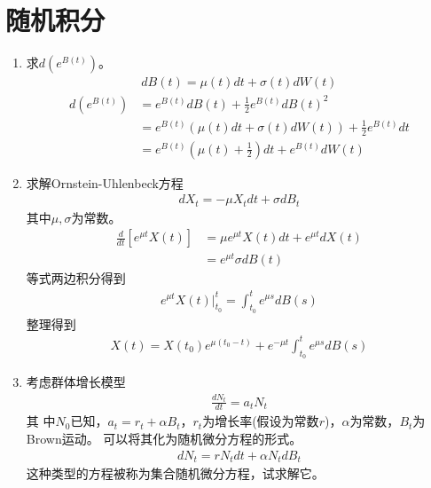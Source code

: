 \section{随机积分}

\begin{enumerate}
	\item 求\(d(e^{B(t)})\)。
	      \begin{align*}
		      dB(t)=\mu(t)dt+\sigma(t)dW(t)
	      \end{align*}
	      \begin{align*}
		      d(e^{B(t)}) & =e^{B(t)}dB(t)+\frac{1}{2}e^{B(t)}dB(t)^2                \\
		                  & =e^{B(t)}(\mu(t)dt+\sigma(t)dW(t))+\frac{1}{2}e^{B(t)}dt \\
		                  & =e^{B(t)}(\mu(t)+\frac{1}{2})dt+e^{B(t)}dW(t)
	      \end{align*}
	\item 求解Ornstein-Uhlenbeck方程\begin{align*}dX_t=-\mu X_tdt+\sigma dB_t\end{align*}其中\(\mu,\sigma\)为常数。
	      \begin{align*}
		      \frac{d}{dt}[e^{\mu t}X(t)]
		       & =\mu e^{\mu t}X(t)dt+e^{\mu t}dX(t) \\
		       & =e^{\mu t}\sigma dB(t)
	      \end{align*}
	      等式两边积分得到
	      \begin{align*}
		      e^{\mu t}X(t)\bigg|^t_{t_0}=\int_{t_0}^{t}e^{\mu s}dB(s)
	      \end{align*}
	      整理得到
	      \begin{align*}
		      X(t)=X(t_0)e^{\mu (t_0-t)}+e^{-\mu t}\int_{t_0}^{t}e^{\mu s}dB(s)
	      \end{align*}
	\item 考虑群体增长模型
	      \begin{align*}
		      \frac{dN_t}{dt}=a_tN_t
	      \end{align*}其
	      中\(N_0\)已知，\(a_t=r_t+\alpha B_t\)，\(r_t\)为增长率(假设为常数\(r\))，\(\alpha\)为常数，\(B_t\)为Brown运动。
	      可以将其化为随机微分方程的形式。
	      \begin{align*}
		      dN_t=rN_tdt+\alpha N_tdB_t
	      \end{align*}
	      这种类型的方程被称为集合随机微分方程，试求解它。


\end{enumerate}
